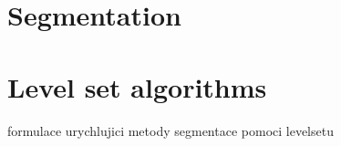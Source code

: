 \section{Segmentation}


\section{Level set algorithms}

formulace
urychlujici metody
segmentace pomoci levelsetu

